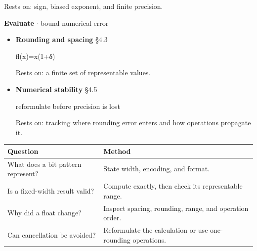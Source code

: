 \documentclass[11pt]{article}
\begin{document}
\begin{keepsection}
\begin{itemize}
Rests on: sign, biased exponent, and finite precision.

\end{itemize}

\textbf{Evaluate} \ensuremath{\cdot} bound numerical error

\begin{itemize}
\item 
{}
\textbf{Rounding and spacing} \hfill{\small\color{FAUblue}§4.3}

fl(x)=x(1+δ)

Rests on: a finite set of representable values.

\item 
{}
\textbf{Numerical stability} \hfill{\small\color{FAUblue}§4.5}

reformulate before precision is lost

Rests on: tracking where rounding error enters and how operations propagate it.

\end{itemize}

\begin{center}\small\begin{tabularx}{\linewidth}{>{\raggedright\arraybackslash}X>{\raggedright\arraybackslash}X}\toprule
\textbf{Question} & \textbf{Method} \\ \midrule
What does a bit pattern represent? & State width, encoding, and format. \\
Is a fixed-width result valid? & Compute exactly, then check its representable range. \\
Why did a float change? & Inspect spacing, rounding, range, and operation order. \\
Can cancellation be avoided? & Reformulate the calculation or use one-rounding operations. \\
\bottomrule\end{tabularx}\end{center}
\end{keepsection}
\end{document}
